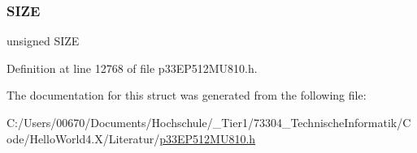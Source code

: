 \subsubsection{\texorpdfstring{S\+I\+ZE}{SIZE}}
{\footnotesize\ttfamily unsigned S\+I\+ZE}



Definition at line 12768 of file p33\+E\+P512\+M\+U810.\+h.



The documentation for this struct was generated from the following file\+:\begin{DoxyCompactItemize}
\item 
C\+:/\+Users/00670/\+Documents/\+Hochschule/\+\_\+\+Tier1/73304\+\_\+\+Technische\+Informatik/\+Code/\+Hello\+World4.\+X/\+Literatur/\hyperlink{p33_e_p512_m_u810_8h}{p33\+E\+P512\+M\+U810.\+h}\end{DoxyCompactItemize}
